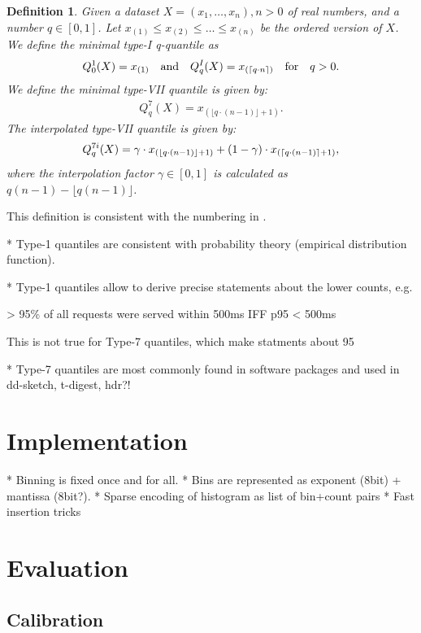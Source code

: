 \documentclass{article}
\DeclarePairedDelimiter{\ceil}{\lceil}{\rceil}
\theoremstyle{plain}
\newtheorem{definition}{Definition}[section]
\theoremstyle{remark}
\newcommand{\qtext}[1]{\quad\text{#1}\quad} %
\newcommand{\floor}[1]{\lfloor#1\rfloor}
\begin{document}
\begin{definition}
  Given a dataset $X=(x_1,\dots,x_n), n>0$ of real numbers, and a number $q \in [0,1]$.
  Let $x_{(1)} \leq x_{(2)} \leq \dots \leq x_{(n)}$ be the ordered version of $X$.
  We define the minimal type-I q-quantile as
  \begin{align*}
    Q^1_0(X) = x_{(1)} \qtext{and}  Q^I_q(X) = x_{(\ceil{q \cdot n})} \qtext{for} q > 0.
  \end{align*}
  We define the minimal type-VII quantile is given by:
  \begin{align*}
    Q^{7}_q(X) = x_{(\floor{q \cdot (n - 1)} + 1)}.
  \end{align*}
  The interpolated type-VII quantile is given by:
  \begin{align*}
    Q^{7i}_q(X) = \gamma \cdot x_{(\floor{q \cdot (n - 1)} + 1)} + (1-\gamma) \cdot x_{(\ceil{q \cdot (n - 1)} + 1)},
  \end{align*}
  where the interpolation factor $\gamma \in [0,1]$ is calculated as $q(n-1) - \floor{q(n-1)}$.
\end{definition}

This definition is consistent with the numbering in \cite{HF1996}.

* Type-1 quantiles are consistent with probability theory (empirical distribution function).

* Type-1 quantiles allow to derive precise statements about the lower counts, e.g.

> 95\% of all requests were served within 500ms IFF p95 < 500ms

This is not true for Type-7 quantiles, which make statments about 95%

* Type-7 quantiles are most commonly found in software packages and used in dd-sketch, t-digest, hdr?!


\section{Implementation}


* Binning is fixed once and for all.
* Bins are represented as exponent (8bit) + mantissa (8bit?).
* Sparse encoding of histogram as list of bin+count pairs
* Fast insertion tricks

\section{Evaluation}

\clearpage
\subsection{Calibration}
\end{document}
